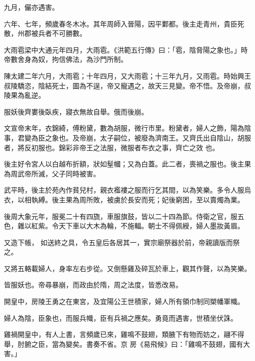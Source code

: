 \begin{pinyinscope}
 九月，儼亦遇害。



 六年、七年，頻歲春冬木冰。其年周師入晉陽，因平鄴都。後主走青州，貴臣死散，州郡被兵者不可勝數。



 大雨雹梁中大通元年四月，大雨雹。《洪範五行傳》曰：「雹，陰脅陽之象也。」時帝數舍身為奴，拘信佛法，為沙門所制。



 陳太建二年六月，大雨雹；十年四月，又大雨雹；十三年九月，又雨雹。時始興王叔陵驕恣，陰結死士，圖為不逞，帝又寵遇之，故天三見變。帝不悟。及帝崩，叔陵果為亂逆。



 服妖後齊婁後臥疾，寢衣無故自舉。俄而後崩。



 文宣帝末年，衣錦綺，傅粉黛，數為胡服，微行市里。粉黛者，婦人之飾，陽為陰事，君變為臣之象也。及帝崩，太子嗣位，被廢為濟南王。又齊氏出自陰山，胡服者，將反初服也。錦彩非帝王之法服，微服者布衣之事，齊亡之效
 也。



 後主好令宮人以白越布折額，狀如髽幗；又為白蓋。此二者，喪禍之服也。後主果為周武帝所滅，父子同時被害。



 武平時，後主於苑內作貧兒村，親衣襤褸之服而行乞其間，以為笑樂。多令人服烏衣，以相執縛。後主果為周所敗，被虜於長安而死；妃後窮困，至以賣燭為業。



 後周大象元年，服冕二十有四旒，車服旗鼓，皆以二十四為節。侍衛之官，服五色，雜以紅紫。令天下車以大木為輪，不施輻。朝士不得佩綬，婦人墨妝黃眉。



 又造下帳，
 如送終之具，令五皇后各居其一，實宗廟祭器於前，帝親讀版而祭之。



 又將五輅載婦人，身率左右步從。又倒懸雞及碎瓦於車上，觀其作聲，以為笑樂。



 皆服妖也。帝尋暴崩，而政由於隋，周之法度，皆悉改易。



 開皇中，房陵王勇之在東宮，及宜陽公王世積家，婦人所有領巾制同槊幡軍幟。



 婦人為陰，臣象也，而服兵幟，臣有兵禍之應矣。勇竟而遇害，世積坐伏誅。



 雞禍開皇中，有人上書，言頻歲已來，雞鳴不鼓翅，類腋下有物而妨之，翮不得舉，肘腑之臣，當為變矣。書奏不省。京
 房《易飛候》曰：「雞鳴不鼓翅，國有大害。」




\end{pinyinscope}
